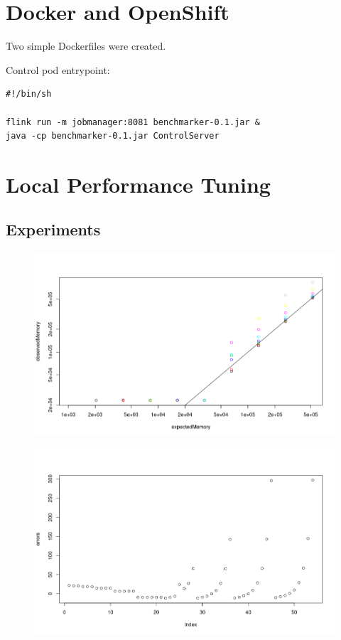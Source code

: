 \documentclass{article}
\begin{document}

\section{Docker and OpenShift}

Two simple Dockerfiles were created.

Control pod entrypoint:
\begin{lstlisting}
#!/bin/sh

flink run -m jobmanager:8081 benchmarker-0.1.jar &
java -cp benchmarker-0.1.jar ControlServer
\end{lstlisting}



\section{Local Performance Tuning}

\subsection{Experiments}

\begin{figure}
  \centering
  \includegraphics[width=\textwidth]{../proof_of_concept/comparison1.png}
  \caption{}
  \label{}
\end{figure}

\begin{figure}
  \centering
  \includegraphics[width=\textwidth]{../proof_of_concept/comparison2.png}
  \caption{}
  \label{}
\end{figure}
\end{document}
